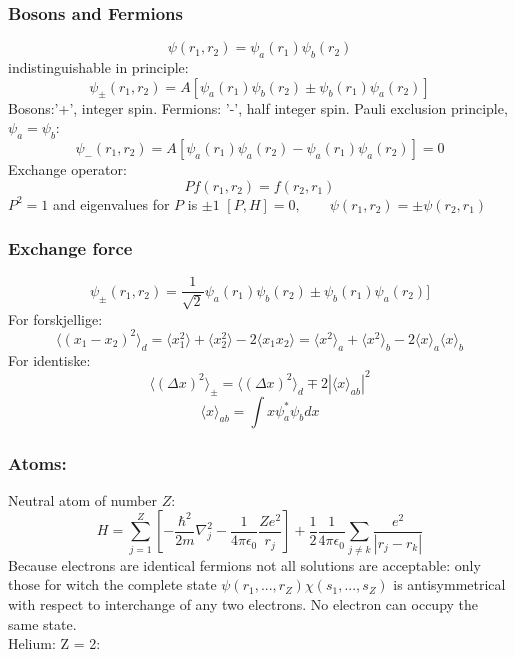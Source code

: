 \documentclass[a4paper,norsk, 10pt]{article}
\begin{document}
\subsubsection{Bosons and Fermions}
\begin{equation}
\psi(r_1,r_2) = \psi_a(r_1)\psi_b(r_2)
\end{equation}
indistinguishable in principle:
\begin{equation}
\psi_{\pm}(r_1,r_2) = A[\psi_a(r_1)\psi_b(r_2) \pm \psi_b(r_1)\psi_a(r_2)]
\label{eq:identPart}
\end{equation}
Bosons:'+', integer spin. Fermions: '-', half integer spin.
Pauli exclusion principle,$\psi_a = \psi_b$:
\begin{equation}
\psi_{-}(r_1,r_2) = A[\psi_a(r_1)\psi_a(r_2) - \psi_a(r_1)\psi_a(r_2)]= 0
\end{equation}
Exchange operator:
\begin{equation}
Pf(r_1,r_2) = f(r_2,r_1)
\end{equation}
$P^2 = 1$ and eigenvalues for $P$ is $\pm 1$
$[P,H] = 0, \qquad \psi(r_1,r_2) = \pm \psi(r_2,r_1)$
\subsubsection{Exchange force}
\begin{equation}
\psi_{\pm}(r_1,r_2) = \frac{1}{\sqrt{2}}\psi_a(r_1)\psi_b(r_2) \pm \psi_b(r_1)\psi_a(r_2)]
\end{equation}
For forskjellige:
\begin{equation}
\langle (x_1 - x_2)^2\rangle_d = \langle x_1^2\rangle + \langle x_2^2\rangle - 
2\langle x_1x_2\rangle =  \langle x^2\rangle_a + \langle x^2\rangle_b - 
2\langle x\rangle_a\langle x\rangle_b
\end{equation}
For identiske:
\begin{equation}
\langle (\Delta x)^2\rangle_{\pm} = \langle(\Delta x)^2\rangle_d \mp 2|\langle x \rangle_{ab}|^2
\end{equation}
\begin{equation}
\langle x \rangle_{ab} = \int x\psi_a^*\psi_b dx
\end{equation}
\subsubsection{Atoms:}
Neutral atom of number $Z$:
\begin{equation}
H = \sum_{j= 1}^Z\left[-\frac{\hbar^2}{2m}\nabla_j^2 - \frac{1}{4\pi \epsilon_0}\frac{Ze^2}{r_j}\right] + \frac{1}{2}\frac{1}{4\pi \epsilon_0}\sum_{j\neq k}\frac{e^2}{|r_j - r_k|}
\end{equation}
Because electrons are identical fermions not all solutions are acceptable: only those for witch the complete state $\psi(r_1,...,r_Z)\chi(s_1,...,s_Z)$ is antisymmetrical with respect to interchange of any two electrons. No electron can occupy the same state.\\
Helium: Z = 2:
\end{document}
